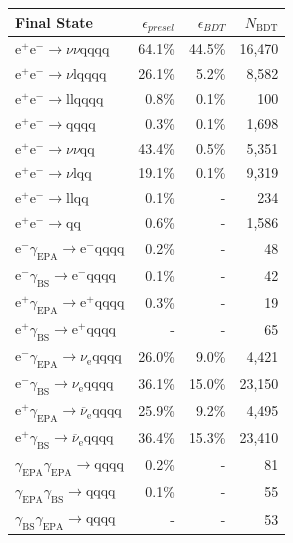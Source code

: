 \begin{table}[h!]
\centering
\begin{tabular}{ l r r r }
\hline
Final State & $\epsilon_{presel}$ & $\epsilon_{BDT}$ & $N_{\text{BDT}}$ \\ 
\hline
$\text{e}^{+}\text{e}^{-} \rightarrow \nu{\nu}\text{qqqq}$ & 64.1\% & 44.5\% & 16,470 \\
$\text{e}^{+}\text{e}^{-} \rightarrow \nu\text{lqqqq}$ & 26.1\% & 5.2\% & 8,582 \\
$\text{e}^{+}\text{e}^{-} \rightarrow \text{llqqqq}$ & 0.8\% & 0.1\% & 100 \\
$\text{e}^{+}\text{e}^{-} \rightarrow \text{qqqq}$ & 0.3\% & 0.1\% & 1,698 \\
$\text{e}^{+}\text{e}^{-} \rightarrow \nu{\nu}\text{qq}$ & 43.4\% & 0.5\% & 5,351 \\
$\text{e}^{+}\text{e}^{-} \rightarrow \nu\text{lqq}$ & 19.1\% & 0.1\% & 9,319 \\
$\text{e}^{+}\text{e}^{-} \rightarrow \text{llqq}$ & 0.1\% & - & 234 \\
$\text{e}^{+}\text{e}^{-} \rightarrow \text{qq}$ & 0.6\% & - & 1,586 \\
$\text{e}^{-}\gamma_{\text{EPA}} \rightarrow \text{e}^{-}\text{qqqq}$ & 0.2\% & - & 48 \\
$\text{e}^{-}\gamma_{\text{BS}} \rightarrow \text{e}^{-}\text{qqqq}$ & 0.1\% & - & 42 \\
$\text{e}^{+}\gamma_{\text{EPA}} \rightarrow \text{e}^{+}\text{qqqq}$ & 0.3\% & - & 19 \\
$\text{e}^{+}\gamma_{\text{BS}} \rightarrow \text{e}^{+}\text{qqqq}$ & - & - & 65 \\
$\text{e}^{-}\gamma_{\text{EPA}} \rightarrow \nu_{\text{e}}\text{qqqq}$ & 26.0\% & 9.0\% & 4,421 \\
$\text{e}^{-}\gamma_{\text{BS}} \rightarrow \nu_{\text{e}}\text{qqqq}$ & 36.1\% & 15.0\% & 23,150 \\
$\text{e}^{+}\gamma_{\text{EPA}} \rightarrow \overline{\nu}_{\text{e}}\text{qqqq}$ & 25.9\% & 9.2\% & 4,495 \\
$\text{e}^{+}\gamma_{\text{BS}} \rightarrow \overline{\nu}_{\text{e}}\text{qqqq}$ & 36.4\% & 15.3\% & 23,410 \\
$\gamma_{\text{EPA}}\gamma_{\text{EPA}} \rightarrow \text{qqqq}$ & 0.2\% & - & 81 \\
$\gamma_{\text{EPA}}\gamma_{\text{BS}} \rightarrow \text{qqqq}$ & 0.1\% & - & 55 \\
$\gamma_{\text{BS}}\gamma_{\text{EPA}} \rightarrow \text{qqqq}$ & - & - & 53 \\

\end{tabular}
\end{table}
